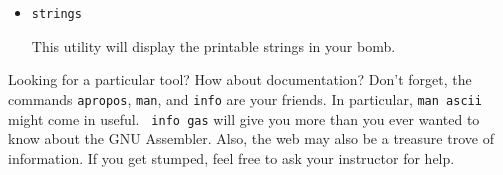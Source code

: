 \documentclass[11pt]{article}
\begin{document}
\begin{itemize}
\item {\tt strings }

This utility will display the printable strings in your bomb.



\end{itemize}

Looking for a particular tool?  How about documentation?  Don't
forget, the commands {\tt apropos}, {\tt man}, and {\tt info} are your
friends.  In particular, {\tt man ascii} might come in useful. {\tt
info gas} will give you more than you ever wanted to know about the
GNU Assembler. Also, the web may also be a treasure trove of
information.  If you get stumped, feel free to ask your instructor for help.
\end{document}
